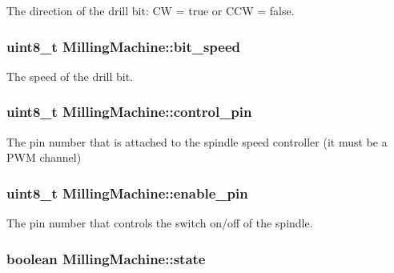 The direction of the drill bit\+: C\+W = true or C\+C\+W = false. 

\hypertarget{class_milling_machine_a1980b7b766917656ce78d25c11b3b5c3}{
\subsubsection[{bit\+\_\+speed}]{\setlength{\rightskip}{0pt plus 5cm}uint8\+\_\+t Milling\+Machine\+::bit\+\_\+speed\hspace{0.3cm}{\ttfamily [private]}}}\label{class_milling_machine_a1980b7b766917656ce78d25c11b3b5c3}


The speed of the drill bit. 

\hypertarget{class_milling_machine_a6e0a4a728c4063b82d0f726123817d69}{
\subsubsection[{control\+\_\+pin}]{\setlength{\rightskip}{0pt plus 5cm}uint8\+\_\+t Milling\+Machine\+::control\+\_\+pin\hspace{0.3cm}{\ttfamily [private]}}}\label{class_milling_machine_a6e0a4a728c4063b82d0f726123817d69}


The pin number that is attached to the spindle speed controller (it must be a P\+W\+M channel) 

\hypertarget{class_milling_machine_a129e02eb0a1b612587fd0175a413cfdd}{
\subsubsection[{enable\+\_\+pin}]{\setlength{\rightskip}{0pt plus 5cm}uint8\+\_\+t Milling\+Machine\+::enable\+\_\+pin\hspace{0.3cm}{\ttfamily [private]}}}\label{class_milling_machine_a129e02eb0a1b612587fd0175a413cfdd}


The pin number that controls the switch on/off of the spindle. 

\hypertarget{class_milling_machine_a8d46b3e3c141e9402a2729b61550babb}{
\subsubsection[{state}]{\setlength{\rightskip}{0pt plus 5cm}boolean Milling\+Machine\+::state\hspace{0.3cm}{\ttfamily [private]}}}\label{class_milling_machine_a8d46b3e3c141e9402a2729b61550babb}


